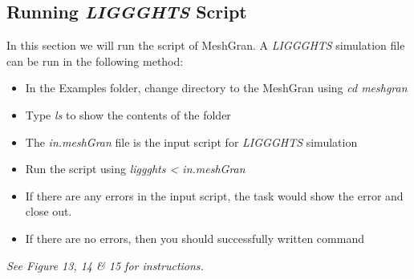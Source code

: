 \documentclass{tufte-book} %
\newcommand{\Li}{\textit{LIGGGHTS}\xspace}
\begin{document}
\subsection{Running \Li Script}



 In this section we will run the script of MeshGran. A \Li simulation file can be run in the following method:
\begin{itemize}
 \item In the Examples folder, change directory to the MeshGran using \textit{\emph{cd meshgran}}
 \item Type \textit{\emph{ls}} to show the contents of the folder
 \item The \textit{\emph{in.meshGran}} file is the input script for \Li simulation
 \item Run the script using \textit{\emph{liggghts < in.meshGran}}
 \item If there are any errors in the input script, the task would show the error and close out. 
 \item If there are no errors, then you should successfully written command
 \end{itemize}
\emph{ See Figure 13, 14 \& 15 for instructions. }
\end{document}
